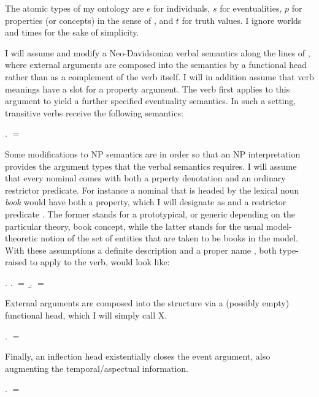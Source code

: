 \documentclass[11pt,a4paper]{article}
\begin{document}
The atomic types of my ontology are $e$ for individuals, $s$ for eventualities, $p$ for properties (or concepts) in the sense of , and $t$ for truth values. I ignore worlds and times for the sake of simplicity.

I will assume and modify a Neo-Davidsonian verbal semantics along the lines of \cite{kratzer96}, where external arguments are composed into the semantics by a functional head rather than as a complement of the verb itself. I will in addition assume that verb meanings have a slot for a property argument. The verb first applies to this argument to yield a further specified eventuality semantics. In such a setting, transitive verbs receive the following semantics:

\ex.  $=$ 

Some modifications to NP semantics are in order so that an NP interpretation provides the argument types that the verbal semantics requires. I will assume that every nominal comes with both a prperty denotation and an ordinary restrictor predicate. For instance a nominal that is headed by the lexical noun \emph{book} would have both a property, which I will designate as  and a restrictor predicate . The former stands for a prototypical, or generic depending on the particular theory, book concept, while the latter stands for the usual model-theoretic notion of the set of entities that are taken to be books in the model. With these assumptions a definite description  and a proper name , both type-raised to apply to the verb, would look like:

\ex.\label{exdefprov}
\a.
 $=$  
\b.
 $=$  

External arguments are composed into the structure via a (possibly empty) functional head, which I will simply call X.

\ex.  $=$ 

Finally, an inflection head existentially closes the event argument, also augmenting the temporal/aspectual information.

\ex.  $=$ 
\end{document}
